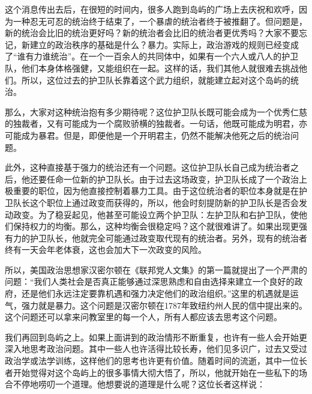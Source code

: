 
这个消息传出去后，在很短的时间内，很多人跑到岛屿的广场上去庆祝和欢呼，因为一种忍无可忍的统治终于结束了，一个暴虐的统治者终于被推翻了。但问题是，新的统治会比旧的统治更好吗？新的统治者会比旧的统治者更优秀吗？大家不要忘记，新建立的政治秩序的基础是什么？暴力。实际上，政治游戏的规则已经变成了“谁有力谁统治”。在一个一百余人的共同体中，如果有一个六人或八人的护卫队，他们本身体格强健，又能组织在一起。这样的话，我们其他人就很难去挑战他们。所以，这位过去的护卫队长靠着这个武力组织，就能建立起对这个岛屿的统治。

那么，大家对这种统治抱有多少期待呢？这位护卫队长既可能会成为一个优秀仁慈的独裁者，又有可能成为一个腐败骄横的独裁者。一句话，他既可能成为明君，亦可能成为暴君。但是，即便他是一个开明君主，仍然不能解决他死之后的统治问题。

此外，这种直接基于强力的统治还有一个问题。这位护卫队长自己成为统治者之后，他还要任命一位新的护卫队长。由于过去这场政变，护卫队长成了一个政治上极重要的职位，因为他直接控制着暴力工具。由于这位统治者的职位本身就是在护卫队长这个职位上通过政变而获得的，所以，他会时刻提防新的护卫队长是否会发动政变。为了稳妥起见，他甚至可能设立两个护卫队：左护卫队和右护卫队，使他们保持权力的均衡。那么，这种均衡会很稳定吗？这个就很难讲了。如果出现更强有力的护卫队长，他就完全可能通过政变取代现有的统治者。另外，现有的统治者终有一天会年老体衰，这也会加大下一次政变的风险。

所以，美国政治思想家汉密尔顿在《联邦党人文集》的第一篇就提出了一个严肃的问题：“我们人类社会是否真正能够通过深思熟虑和自由选择来建立一个良好的政府，还是他们永远注定要靠机遇和强力决定他们的政治组织。”这里的机遇就是运气，强力就是暴力。这个问题是汉密尔顿在1787年致纽约州人民的信中提出来的。这个问题还可以拿来问教室里的每一个人，所有人都应该去思考这个问题。

我们再回到岛屿之上。如果上面讲到的政治情形不断重复，也许有一些人会开始更深入地思考政治问题。其中一些人也许活得比较长寿，他们见多识广，过去又受过政治学或法学训练，这样他们的思考也许更有价值。随着时间的流逝，其中一位长者开始觉得对这个岛屿上的很多事情大彻大悟了，所以，他就开始在一些私下的场合不停地唠叨一个道理。他想要说的道理是什么呢？这位长者这样说：


